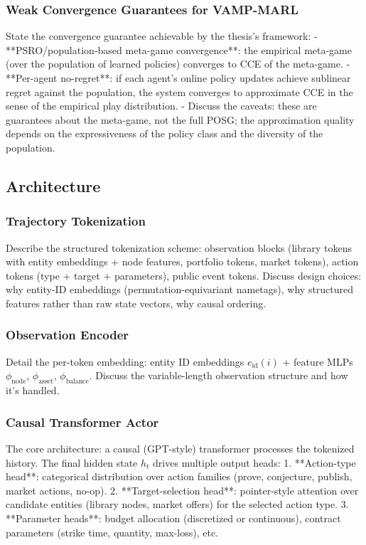 \subsubsection{Weak Convergence Guarantees for VAMP-MARL}
State the convergence guarantee achievable by the thesis's framework:
- **PSRO/population-based meta-game convergence**: the empirical meta-game (over the population of learned policies) converges to CCE of the meta-game.
- **Per-agent no-regret**: if each agent's online policy updates achieve sublinear regret against the population, the system converges to approximate CCE in the sense of the empirical play distribution.
- Discuss the caveats: these are guarantees about the meta-game, not the full POSG; the approximation quality depends on the expressiveness of the policy class and the diversity of the population.

\subsection{Architecture}

\subsubsection{Trajectory Tokenization}
Describe the structured tokenization scheme: observation blocks (library tokens with entity embeddings + node features, portfolio tokens, market tokens), action tokens (type + target + parameters), public event tokens. Discuss design choices: why entity-ID embeddings (permutation-equivariant nametags), why structured features rather than raw state vectors, why causal ordering.

\subsubsection{Observation Encoder}
Detail the per-token embedding: entity ID embeddings $e_{\text{id}}(i)$ + feature MLPs $\phi_{\text{node}}$, $\phi_{\text{asset}}$, $\phi_{\text{balance}}$. Discuss the variable-length observation structure and how it's handled.

\subsubsection{Causal Transformer Actor}
The core architecture: a causal (GPT-style) transformer processes the tokenized history. The final hidden state $h_t$ drives multiple output heads:
1. **Action-type head**: categorical distribution over action families (prove, conjecture, publish, market actions, no-op).
2. **Target-selection head**: pointer-style attention over candidate entities (library nodes, market offers) for the selected action type.
3. **Parameter heads**: budget allocation (discretized or continuous), contract parameters (strike time, quantity, max-loss), etc.

